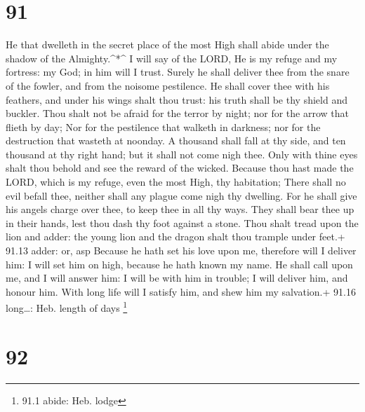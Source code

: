 \hypertarget{section-90}{%
\section{91}\label{section-90}}

 He that dwelleth in the secret place of the most High shall
abide under the shadow of the Almighty.\^{}*\^{}  I will say
of the LORD, He is my refuge and my fortress: my God; in him will I
trust.  Surely he shall deliver thee from the snare of the
fowler, and from the noisome pestilence.  He shall cover
thee with his feathers, and under his wings shalt thou trust: his truth
shall be thy shield and buckler.  Thou shalt not be afraid
for the terror by night; nor for the arrow that flieth by day;
 Nor for the pestilence that walketh in darkness; nor for
the destruction that wasteth at noonday.  A thousand shall
fall at thy side, and ten thousand at thy right hand; but it shall not
come nigh thee.  Only with thine eyes shalt thou behold and
see the reward of the wicked.  Because thou hast made the
LORD, which is my refuge, even the most High, thy habitation;
 There shall no evil befall thee, neither shall any plague
come nigh thy dwelling.  For he shall give his angels
charge over thee, to keep thee in all thy ways.  They shall
bear thee up in their hands, lest thou dash thy foot against a stone.
 Thou shalt tread upon the lion and adder: the young lion
and the dragon shalt thou trample under feet.+ 91.13 adder: or, asp
 Because he hath set his love upon me, therefore will I
deliver him: I will set him on high, because he hath known my name.
 He shall call upon me, and I will answer him: I will be
with him in trouble; I will deliver him, and honour him. 
With long life will I satisfy him, and shew him my salvation.+ 91.16
long\ldots: Heb. length of days \footnote{91.1 abide: Heb. lodge}

\hypertarget{section-91}{%
\section{92}\label{section-91}}

